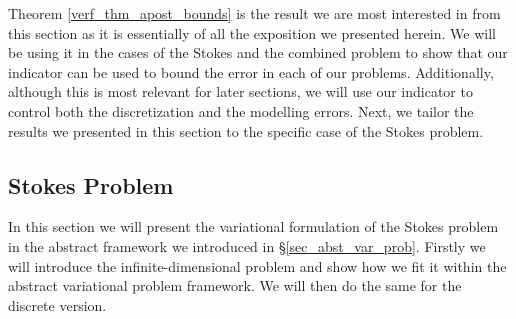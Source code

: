 \documentclass[12pt,a4paper]{article}
\theoremstyle{definition}
\begin{document}
Theorem \ref{verf_thm_apost_bounds} is the result we are most interested in from this section as it is essentially of all the exposition we presented herein.  We will be using it in the cases of the Stokes and the combined problem to show that our indicator can be used to bound the error in each of our problems.  Additionally, although this is most relevant for later sections, we will use our indicator to control both the discretization and the modelling errors. Next, we tailor the results we presented in this section to the specific case of the Stokes problem.
\subsection{Stokes Problem}
In this section we will present the variational formulation of the Stokes problem in the abstract framework we introduced in \S \ref{sec_abst_var_prob}.  Firstly we will introduce the infinite-dimensional problem and show how we fit it within the abstract variational problem framework. We will then do the same for the discrete version.  
\end{document}
